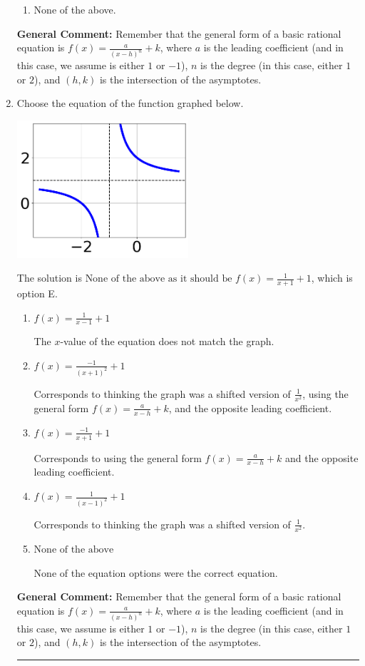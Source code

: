 \documentclass{extbook}[14pt]
\newcommand{\litem}[1]{\item #1

\rule{\textwidth}{0.4pt}}
\begin{document}
\begin{enumerate}
{\begin{enumerate}[label=\Alph*.]
\begin{multicols}{2}
\end{multicols}\item None of the above.\end{enumerate}
\textbf{General Comment:} Remember that the general form of a basic rational equation is $ f(x) = \frac{a}{(x-h)^n} + k$, where $a$ is the leading coefficient (and in this case, we assume is either $1$ or $-1$), $n$ is the degree (in this case, either $1$ or $2$), and $(h, k)$ is the intersection of the asymptotes.
}
\litem{
Choose the equation of the function graphed below.

\begin{center}
    \includegraphics[width=0.5\textwidth]{../Figures/rationalGraphToEquationCopyC.png}
\end{center}



The solution is \( \text{None of the above as it should be } f(x) = \frac{1}{x + 1} + 1 \), which is option E.\begin{enumerate}[label=\Alph*.]
\item \( f(x) = \frac{1}{x - 1} + 1 \)

The $x$-value of the equation does not match the graph.
\item \( f(x) = \frac{-1}{(x + 1)^2} + 1 \)

Corresponds to thinking the graph was a shifted version of $\frac{1}{x^2}$, using the general form $f(x) = \frac{a}{x-h}+k$, and the opposite leading coefficient.
\item \( f(x) = \frac{-1}{x + 1} + 1 \)

Corresponds to using the general form $f(x) = \frac{a}{x-h}+k$ and the opposite leading coefficient.
\item \( f(x) = \frac{1}{(x - 1)^2} + 1 \)

Corresponds to thinking the graph was a shifted version of $\frac{1}{x^2}$.
\item \( \text{None of the above} \)

None of the equation options were the correct equation.
\end{enumerate}

\textbf{General Comment:} Remember that the general form of a basic rational equation is $ f(x) = \frac{a}{(x-h)^n} + k$, where $a$ is the leading coefficient (and in this case, we assume is either $1$ or $-1$), $n$ is the degree (in this case, either $1$ or $2$), and $(h, k)$ is the intersection of the asymptotes.
}
\end{enumerate}
\end{document}
